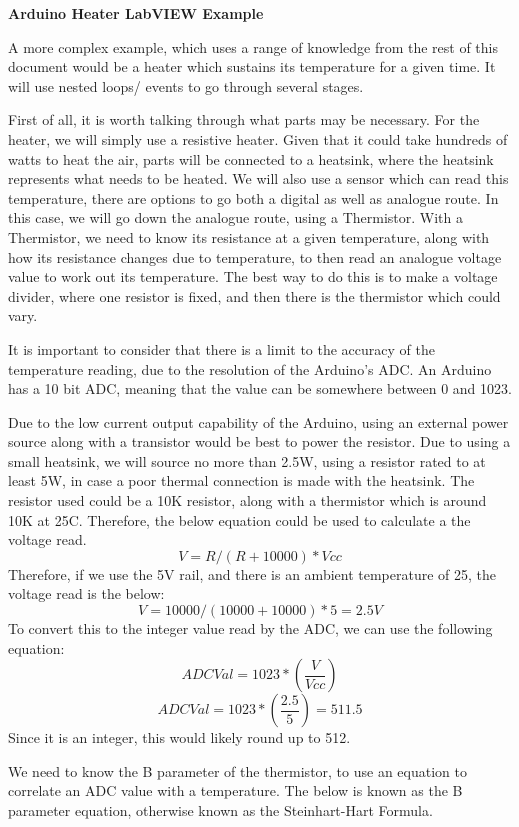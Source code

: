 \documentclass[a4paper,11pt]{report}
\begin{document}
\textbf{Arduino Heater LabVIEW Example}

A more complex example, which uses a range of knowledge from the rest of this document would be a heater which sustains its temperature for a given time. It will use nested loops/ events to go through several stages.

First of all, it is worth talking through what parts may be necessary. For the heater, we will simply use a resistive heater. Given that it could take hundreds of watts to heat the air, parts will be connected to a heatsink, where the heatsink represents what needs to be heated. We will also use a sensor which can read this temperature, there are options to go both a digital as well as analogue route. In this case, we will go down the analogue route, using a Thermistor. With a Thermistor, we need to know its resistance at a given temperature, along with how its resistance changes due to temperature, to then read an analogue voltage value to work out its temperature. The best way to do this is to make a voltage divider, where one resistor is fixed, and then there is the thermistor which could vary.

It is important to consider that there is a limit to the accuracy of the temperature reading, due to the resolution of the Arduino's ADC. An Arduino has a 10 bit ADC, meaning that the value can be somewhere between 0 and 1023.

Due to the low current output capability of the Arduino, using an external power source along with a transistor would be best to power the resistor. Due to using a small heatsink, we will source no more than 2.5W, using a resistor rated to at least 5W, in case a poor thermal connection is made with the heatsink. The resistor used could be a 10K resistor, along with a thermistor which is around 10K at 25\degree C. Therefore, the below equation could be used to calculate a the voltage read.
\[V = R / (R + 10000) * Vcc\]
Therefore, if we use the 5V rail, and there is an ambient temperature of 25, the voltage read is the below:
\[V = 10000/(10000+10000) * 5 = 2.5V\]
To convert this to the integer value read by the ADC, we can use the following equation:
\[ADCVal = 1023*(\frac{V}{Vcc})\]
\[ADCVal = 1023*(\frac{2.5}{5}) = 511.5\]
Since it is an integer, this would likely round up to 512.

We need to know the B parameter of the thermistor, to use an equation to correlate an ADC value with a temperature. The below is known as the B parameter equation, otherwise known as the Steinhart-Hart Formula.
\end{document}
